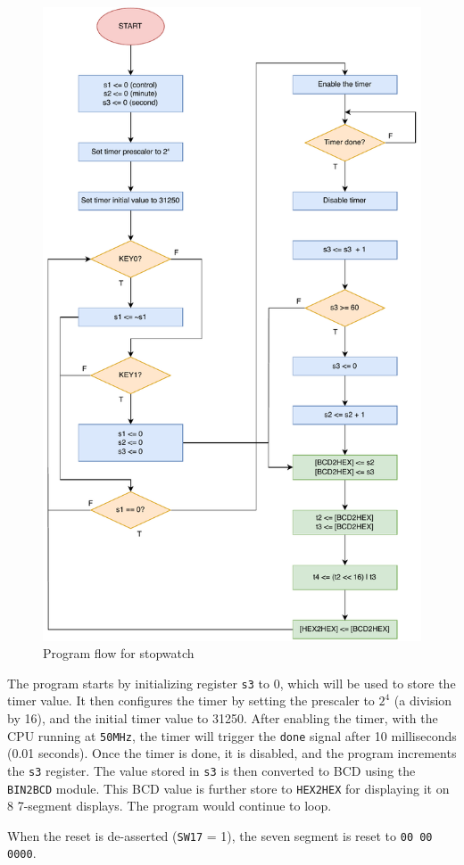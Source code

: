 \documentclass[12pt,a4paper,oneside]{book} %
\begin{document}
\begin{figure}[H]
    \centering
    \includegraphics[width=.7\textwidth]{images/flowchart/stopwatch.pdf}
    \caption{Program flow for stopwatch}
\end{figure}

The program starts by initializing register \texttt{s3} to 0, which will be used to store the timer value. It then configures the timer by setting the prescaler to $2^4$ (a division by 16), and the initial timer value to 31250. After enabling the timer, with the CPU running at \texttt{50MHz}, the timer will trigger the \texttt{done} signal after 10 milliseconds (0.01 seconds). Once the timer is done, it is disabled, and the program increments the \texttt{s3} register. The value stored in \texttt{s3} is then converted to BCD using the \texttt{BIN2BCD} module. This BCD value is further store to \texttt{HEX2HEX} for displaying it on 8 7-segment displays. The program would continue to loop.

When the reset is de-asserted (\texttt{SW17} = 1), the seven segment is reset to \texttt{00 00 0000}.
\end{document}
